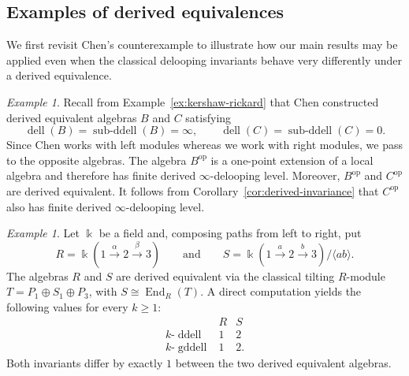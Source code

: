 \documentclass[12pt,a4paper,reqno]{amsart}
\theoremstyle{plain}
\theoremstyle{definition}
\theoremstyle{remark}
\newtheorem{example}[theorem]{Example}
\DeclareMathOperator{\End}{End}
\DeclareMathOperator{\op}{op}
\DeclareMathOperator{\dell}{dell}
\DeclareMathOperator{\subddell}{sub\text{-}ddell}
\DeclareMathOperator{\ddell}{ddell}
\DeclareMathOperator{\gddell}{gddell}
\begin{document}
\subsection{Examples of derived equivalences} We first revisit Chen's counterexample to illustrate how our main
results may be applied even when the classical delooping invariants behave very differently under a derived equivalence.

\begin{example}
Recall from Example~\ref{ex:kershaw-rickard} that Chen constructed
derived equivalent algebras $B$ and $C$ satisfying
\[
\dell(B)=\subddell(B)=\infty,\qquad \dell(C)=\subddell(C)=0.
\]
Since Chen works with left modules whereas we work with right modules,
we pass to the opposite algebras. The algebra $B^{\op}$ is a one-point
extension of a local algebra and therefore has finite derived
$\infty$-delooping level. Moreover, $B^{\op}$ and $C^{\op}$ are derived
equivalent. It follows from Corollary~\ref{cor:derived-invariance} that
$C^{\op}$ also has finite derived $\infty$-delooping level.
\end{example}

\begin{example}
Let $\Bbbk$ be a field and, composing paths from left to right, put
\[
R=\Bbbk\left(1\xrightarrow{\alpha}2\xrightarrow{\beta}3\right) \qquad\text{and} \qquad
S=\Bbbk\left(1\xrightarrow{a}2\xrightarrow{b}3\right)
\big/\langle ab\rangle.
\]
The algebras $R$ and $S$ are derived equivalent via the classical tilting $R$-module $T=P_1\oplus S_1\oplus P_3$, with $S\cong\End_R(T)$.
A direct computation yields the following values for every $k\ge 1$:
\[
\begin{array}{c|cc}
 & R & S \\ \hline
k\text{-}\ddell & 1 & 2\\
k\text{-}\gddell & 1 & 2.
\end{array}
\]
Both invariants differ by exactly $1$ between the two derived equivalent algebras.
\end{example}
\end{document}
